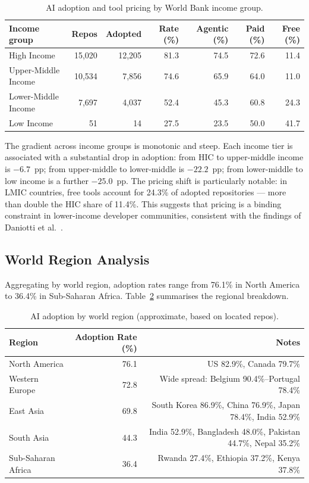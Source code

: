 \begin{table}[h]
\centering
\caption{AI adoption and tool pricing by World Bank income group.}
\label{tab:income}
\begin{tabular}{@{}lrrrrrr@{}}
\toprule
Income group & Repos & Adopted & Rate (\%) & Agentic (\%) & Paid (\%) & Free (\%) \\
\midrule
High Income         & 15,020 & 12,205 & 81.3 & 74.5 & 72.6 & 11.4 \\
Upper-Middle Income & 10,534 &  7,856 & 74.6 & 65.9 & 64.0 & 11.0 \\
Lower-Middle Income &  7,697 &  4,037 & 52.4 & 45.3 & 60.8 & 24.3 \\
Low Income          &     51 &     14 & 27.5 & 23.5 & 50.0 & 41.7 \\
\bottomrule
\end{tabular}
\end{table}

The gradient across income groups is monotonic and steep. Each income tier is associated with a substantial drop in adoption: from HIC to upper-middle income is $-6.7$~pp; from upper-middle to lower-middle is $-22.2$~pp; from lower-middle to low income is a further $-25.0$~pp. The pricing shift is particularly notable: in LMIC countries, free tools account for 24.3\% of adopted repositories --- more than double the HIC share of 11.4\%. This suggests that pricing is a binding constraint in lower-income developer communities, consistent with the findings of Daniotti et al.~\cite{daniotti2025}.

\subsection{World Region Analysis}

Aggregating by world region, adoption rates range from 76.1\% in North America to 36.4\% in Sub-Saharan Africa. Table~\ref{tab:regions} summarises the regional breakdown.

\begin{table}[h]
\centering
\caption{AI adoption by world region (approximate, based on located repos).}
\label{tab:regions}
\begin{tabular}{@{}lrr@{}}
\toprule
Region & Adoption Rate (\%) & Notes \\
\midrule
North America         & 76.1 & US 82.9\%, Canada 79.7\% \\
Western Europe        & 72.8 & Wide spread: Belgium 90.4\%--Portugal 78.4\% \\
East Asia             & 69.8 & South Korea 86.9\%, China 76.9\%, Japan 78.4\%, India 52.9\% \\
South Asia            & 44.3 & India 52.9\%, Bangladesh 48.0\%, Pakistan 44.7\%, Nepal 35.2\% \\
Sub-Saharan Africa    & 36.4 & Rwanda 27.4\%, Ethiopia 37.2\%, Kenya 37.8\% \\
\bottomrule
\end{tabular}
\end{table}

